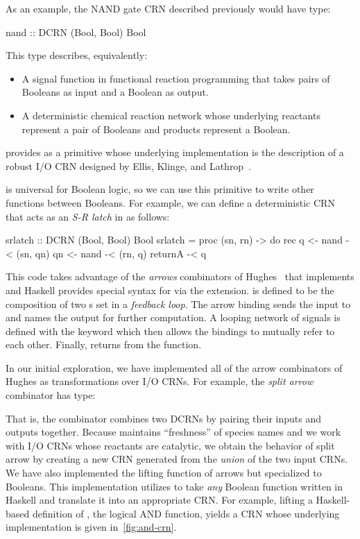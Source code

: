 As an example, the NAND gate CRN described previously would have type:
\begin{haskellcode}
nand :: DCRN (Bool, Bool) Bool
\end{haskellcode}
This type describes, equivalently:
\begin{itemize}[itemsep=0pt]
  \item A signal function in functional reaction programming that takes pairs of Booleans as input and a Boolean as output.
  \item A deterministic chemical reaction network whose underlying reactants represent a pair of Booleans and products represent a Boolean.
\end{itemize}
\reactamole{} provides  as a primitive whose underlying implementation is the description of a robust  I/O CRN designed by Ellis, Klinge, and Lathrop~\cite{rdc}.

 is universal for Boolean logic, so we can use this primitive to write other functions between Booleans.
For example, we can define a deterministic CRN that acts as an \emph{S-R latch} in \reactamole{} as follows:
\begin{haskellcode}
srlatch :: DCRN (Bool, Bool) Bool
srlatch = proc (sn, rn) -> do
    rec q  <- nand -< (sn, qn)
        qn <- nand -< (rn, q)
    returnA -< q
\end{haskellcode}
This code takes advantage of the \emph{arrows} combinators of Hughes~\cite{hughes:2000:arrows} that \reactamole{} implements and Haskell provides special syntax for via the  extension.
 is defined to be the composition of two s set in a \emph{feedback loop}.
The arrow binding  sends the input  to  and names the output  for further computation.
A looping network of signals is defined with the  keyword which then allows the bindings to mutually refer to each other.
Finally,  returns  from the function.

In our initial exploration, we have implemented all of the arrow combinators of Hughes as transformations over I/O CRNs.
For example, the \emph{split arrow} combinator has type:
That is, the combinator combines two DCRNs by pairing their inputs and outputs together.
Because \reactamole{} maintains ``freshness'' of species names and we work with I/O CRNs whose reactants are catalytic, we obtain the behavior of split arrow by creating a new CRN generated from the \emph{union} of the two input CRNs.
We have also implemented the lifting function of arrows  but specialized to Booleans.
This implementation utilizes  to take \emph{any} Boolean function written in Haskell and translate it into an appropriate CRN.
For example, lifting a Haskell-based definition of \hask{&&}, the logical AND function,  yields a CRN whose underlying \reactamole{} implementation is given in~\autoref{fig:and-crn}.

